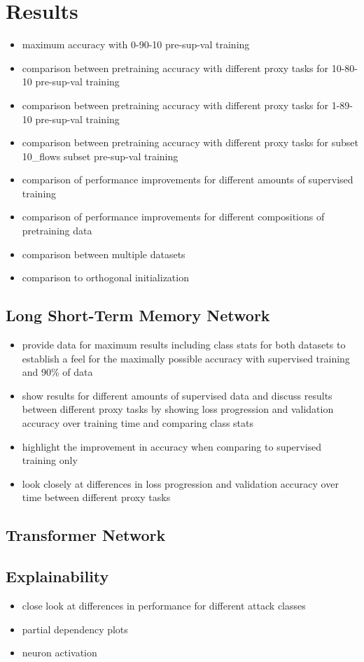 \chapter{Results} \label{sec:results}

\begin{itemize}
	\item maximum accuracy with 0-90-10 pre-sup-val training
	\item comparison between pretraining accuracy with different proxy tasks for 10-80-10 pre-sup-val training
	\item comparison between pretraining accuracy with different proxy tasks for 1-89-10 pre-sup-val training
	\item comparison between pretraining accuracy with different proxy tasks for subset 10\_flows subset pre-sup-val training
	\item comparison of performance improvements for different amounts of supervised training
	\item comparison of performance improvements for different compositions of pretraining data
	\item comparison between multiple datasets
	\item comparison to orthogonal initialization
\end{itemize}

\section{Long Short-Term Memory Network}

\begin{itemize}
	\item provide data for maximum results including class stats for both datasets to establish a feel for the maximally possible accuracy with supervised training and 90\% of data
	\item show results for different amounts of supervised data and discuss results between different proxy tasks by showing loss progression and validation accuracy over training time and comparing class stats
	\item highlight the improvement in accuracy when comparing to supervised training only
	\item look closely at differences in loss progression and validation accuracy over time between different proxy tasks
\end{itemize}

\section{Transformer Network}

\section{Explainability}

\begin{itemize}
	\item close look at differences in performance for different attack classes
	\item partial dependency plots
	\item neuron activation
\end{itemize}

\newpage
